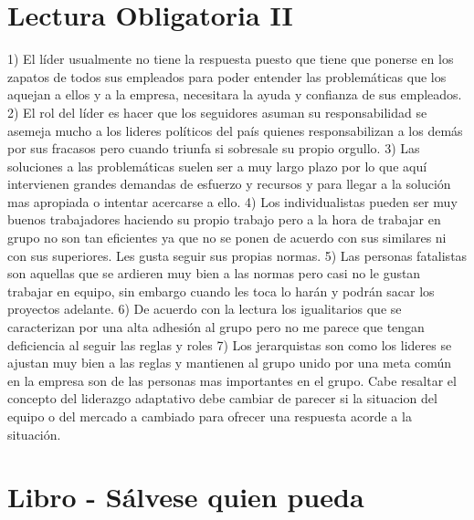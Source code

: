\documentclass[journal]{IEEEtran}
\begin{document}
\section{Lectura Obligatoria II}

1) El líder usualmente no tiene la respuesta puesto que tiene que ponerse en los zapatos de todos sus empleados para poder entender las problemáticas que los aquejan a ellos y a la empresa, necesitara la ayuda y confianza de sus empleados.
2) El rol del líder es hacer que los seguidores asuman su responsabilidad se asemeja mucho a los lideres políticos del país quienes responsabilizan a los demás por sus fracasos pero cuando triunfa si sobresale su propio orgullo.
3) Las soluciones a las problemáticas suelen ser a muy largo plazo por lo que aquí intervienen grandes demandas de esfuerzo y recursos y para llegar a la solución mas apropiada o intentar acercarse a ello. 
4) Los individualistas pueden ser muy buenos trabajadores haciendo su propio trabajo pero a la hora de trabajar en grupo no son tan eficientes ya que no se ponen de acuerdo con sus similares ni con sus superiores. Les gusta seguir sus propias normas.
5) Las personas fatalistas son aquellas que se ardieren muy bien a las normas pero casi no le gustan trabajar en equipo, sin embargo cuando les toca lo harán y podrán sacar los proyectos adelante.
6) De acuerdo con la lectura los igualitarios que se caracterizan por una alta adhesión al grupo pero no me parece que tengan deficiencia al seguir las reglas y roles
7) Los jerarquistas son como los lideres se ajustan muy bien a las reglas y mantienen al grupo unido por una meta común en la empresa son de las personas mas importantes en el grupo. Cabe resaltar el concepto del liderazgo adaptativo debe cambiar de parecer si la situacion del equipo o del mercado a cambiado para ofrecer una respuesta acorde a la situación. 



\section{Libro - Sálvese quien pueda}
\end{document}
